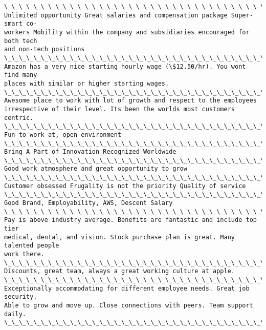 \documentclass[11pt]{article}
\begin{document}
\begin{Verbatim}[commandchars=\\\{\}]
\_\_\_\_\_\_\_\_\_\_\_\_\_\_\_\_\_\_\_\_\_\_\_\_\_\_\_\_\_\_\_\_\_\_\_\_\_\_\_\_\_\_\_\_\_\_\_\_\_\_\_\_\_\_\_\_\_\_\_\_\_\_\_\_\_\_\_\_\_\_
Unlimited opportunity Great salaries and compensation package Super-smart co-
workers Mobility within the company and subsidiaries encouraged for both tech
and non-tech positions
\_\_\_\_\_\_\_\_\_\_\_\_\_\_\_\_\_\_\_\_\_\_\_\_\_\_\_\_\_\_\_\_\_\_\_\_\_\_\_\_\_\_\_\_\_\_\_\_\_\_\_\_\_\_\_\_\_\_\_\_\_\_\_\_\_\_\_\_\_\_
Amazon has a very nice starting hourly wage (\$12.50/hr). You wont find many
places with similar or higher starting wages.
\_\_\_\_\_\_\_\_\_\_\_\_\_\_\_\_\_\_\_\_\_\_\_\_\_\_\_\_\_\_\_\_\_\_\_\_\_\_\_\_\_\_\_\_\_\_\_\_\_\_\_\_\_\_\_\_\_\_\_\_\_\_\_\_\_\_\_\_\_\_
Awesome place to work with lot of growth and respect to the employees
irrespective of their level. Its been the worlds most customers centric.
\_\_\_\_\_\_\_\_\_\_\_\_\_\_\_\_\_\_\_\_\_\_\_\_\_\_\_\_\_\_\_\_\_\_\_\_\_\_\_\_\_\_\_\_\_\_\_\_\_\_\_\_\_\_\_\_\_\_\_\_\_\_\_\_\_\_\_\_\_\_
Fun to work at, open environment
\_\_\_\_\_\_\_\_\_\_\_\_\_\_\_\_\_\_\_\_\_\_\_\_\_\_\_\_\_\_\_\_\_\_\_\_\_\_\_\_\_\_\_\_\_\_\_\_\_\_\_\_\_\_\_\_\_\_\_\_\_\_\_\_\_\_\_\_\_\_
Bring A Part of Innovation Recognized Worldwide
\_\_\_\_\_\_\_\_\_\_\_\_\_\_\_\_\_\_\_\_\_\_\_\_\_\_\_\_\_\_\_\_\_\_\_\_\_\_\_\_\_\_\_\_\_\_\_\_\_\_\_\_\_\_\_\_\_\_\_\_\_\_\_\_\_\_\_\_\_\_
Good work atmosphere and great opportunity to grow
\_\_\_\_\_\_\_\_\_\_\_\_\_\_\_\_\_\_\_\_\_\_\_\_\_\_\_\_\_\_\_\_\_\_\_\_\_\_\_\_\_\_\_\_\_\_\_\_\_\_\_\_\_\_\_\_\_\_\_\_\_\_\_\_\_\_\_\_\_\_
Customer obsessed Frugality is not the priority Quality of service
\_\_\_\_\_\_\_\_\_\_\_\_\_\_\_\_\_\_\_\_\_\_\_\_\_\_\_\_\_\_\_\_\_\_\_\_\_\_\_\_\_\_\_\_\_\_\_\_\_\_\_\_\_\_\_\_\_\_\_\_\_\_\_\_\_\_\_\_\_\_
Good Brand, Employability, AWS, Descent Salary
\_\_\_\_\_\_\_\_\_\_\_\_\_\_\_\_\_\_\_\_\_\_\_\_\_\_\_\_\_\_\_\_\_\_\_\_\_\_\_\_\_\_\_\_\_\_\_\_\_\_\_\_\_\_\_\_\_\_\_\_\_\_\_\_\_\_\_\_\_\_
Pay is above industry average. Benefits are fantastic and include top tier
medical, dental, and vision. Stock purchase plan is great. Many talented people
work there.
\_\_\_\_\_\_\_\_\_\_\_\_\_\_\_\_\_\_\_\_\_\_\_\_\_\_\_\_\_\_\_\_\_\_\_\_\_\_\_\_\_\_\_\_\_\_\_\_\_\_\_\_\_\_\_\_\_\_\_\_\_\_\_\_\_\_\_\_\_\_
Discounts, great team, always a great working culture at apple.
\_\_\_\_\_\_\_\_\_\_\_\_\_\_\_\_\_\_\_\_\_\_\_\_\_\_\_\_\_\_\_\_\_\_\_\_\_\_\_\_\_\_\_\_\_\_\_\_\_\_\_\_\_\_\_\_\_\_\_\_\_\_\_\_\_\_\_\_\_\_
Exceptionally accommodating for different employee needs. Great job security.
Able to grow and move up. Close connections with peers. Team support daily.
\_\_\_\_\_\_\_\_\_\_\_\_\_\_\_\_\_\_\_\_\_\_\_\_\_\_\_\_\_\_\_\_\_\_\_\_\_\_\_\_\_\_\_\_\_\_\_\_\_\_\_\_\_\_\_\_\_\_\_\_\_\_\_\_\_\_\_\_\_\_
    \end{Verbatim}
\end{document}
